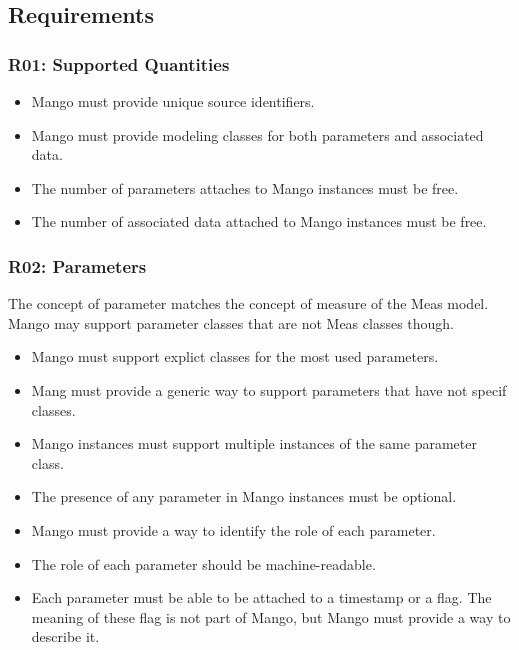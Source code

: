 \documentclass[11pt,a4paper]{ivoa}
\begin{document}
\subsection{Requirements}

\subsubsection{R01: Supported Quantities}
\begin{itemize}
    \item Mango must provide unique source identifiers.
    \item Mango must provide modeling classes for both parameters and associated data.
    \item The number of parameters attaches to Mango instances must be free.
    \item The number of associated data attached to Mango instances must be free.
\end{itemize}

\subsubsection{R02: Parameters}
The concept of parameter matches the concept of measure of the Meas model. Mango may support parameter classes that are not  Meas classes though.
  
\begin{itemize}
    \item Mango must support explict classes for the most used parameters.
    \item Mang must provide a generic way to support parameters that have not specif classes.
    \item Mango instances must support multiple instances of the same parameter class.
    \item The presence of any parameter in Mango instances must be optional.
    \item Mango must provide a way to identify the role of each parameter.
    \item The role of each parameter should be machine-readable.
    \item Each parameter must be able to be attached to a timestamp or a flag. The meaning of these flag is not part of Mango, but Mango must provide a way to describe it.
\end{itemize}
\end{document}

